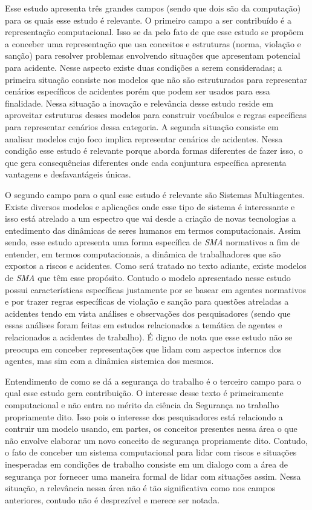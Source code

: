 Esse estudo apresenta três grandes campos (sendo que dois são da computação) para os quais esse estudo é relevante. O primeiro campo a ser contribuído é a representação computacional. Isso se da pelo fato de que esse estudo se propõem a conceber uma representação que usa conceitos e estruturas (norma, violação e sanção) para resolver problemas envolvendo situações que apresentam potencial para acidente. Nesse aspecto existe duas condições a serem 
consideradas; a primeira situação consiste nos modelos que não são estruturados para representar cenários específicos de acidentes porém que podem ser usados para essa finalidade. Nessa situação a inovação e relevância desse estudo reside em aproveitar estruturas desses modelos para construir 
vocábulos e regras específicas para representar cenários dessa categoria. A segunda situação consiste em analisar modelos cujo foco implica representar cenários de acidentes. Nessa condição esse estudo é relevante porque aborda formas diferentes de fazer isso, o que gera consequências diferentes onde cada conjuntura específica apresenta vantagens e desfavantágeis únicas.    

O segundo campo para o qual esse estudo é relevante são Sistemas Multiagentes. Existe diversos modelos e aplicações onde esse tipo de sistema é interessante e isso está atrelado a um espectro que vai desde a criação de novas tecnologias a entedimento das dinâmicas de seres humanos em termos computacionais. Assim sendo, esse estudo apresenta uma forma específica de \textit{SMA} normativos a fim de entender, em termos computacionais, a dinâmica de trabalhadores que são expostos a riscos e acidentes. Como será tratado no texto adiante, existe modelos de \textit{SMA} que têm esse propósito. Contudo o modelo apresentado nesse estudo possui características específicas justamente por se basear em agentes normativos e por trazer regras específicas de violação e sanção para questões atreladas a acidentes tendo em vista análises e observações dos pesquisadores (sendo que essas análises foram feitas em estudos relacionados a temática de agentes e relacionados a acidentes de trabalho). É digno de nota que esse estudo não se preocupa em conceber representações que lidam com aspectos internos dos agentes, mas sim com a dinâmica sistemica dos mesmos.

Entendimento de como se dá a segurança do trabalho é o terceiro campo para o qual esse estudo gera contribuição. O interesse desse texto é primeiramente computacional e não entra no mérito da ciência da Segurança no trabalho propriamente dito. Isso pois o interesse dos pesquisadores está relaciondo a contruir um modelo usando, em partes, os conceitos presentes nessa área o que não envolve elaborar um novo conceito de segurança propriamente dito. Contudo, o fato de conceber um sistema computacional para lidar com riscos e situações inesperadas em condições de trabalho consiste em um dialogo com a área de segurança por fornecer uma maneira formal de lidar com situações assim. Nessa situação, a relevância nessa área não é tão significativa como nos campos anteriores, contudo não é desprezível e merece ser notada.